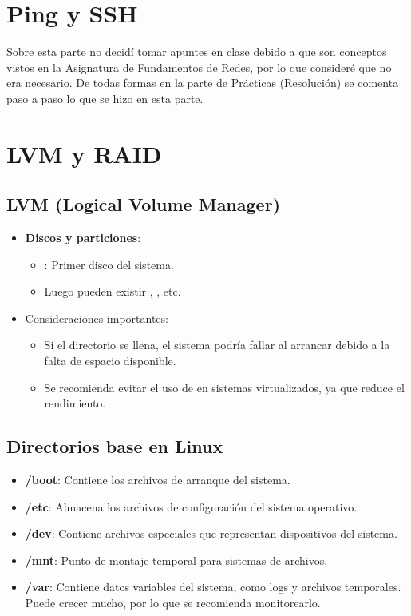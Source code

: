 \section{Ping y SSH}

Sobre esta parte no decidí tomar apuntes en clase debido a que son conceptos vistos en la Asignatura de Fundamentos de Redes, por lo que consideré que no era necesario. De todas formas en la parte de Prácticas (Resolución) se comenta paso a paso lo que se hizo en esta parte.
\newpage
\section{LVM y RAID}

\subsection{LVM (Logical Volume Manager)}

\begin{itemize}
    \item \textbf{Discos y particiones}:
    \begin{itemize}
        \item {}: Primer disco del sistema.
        \item Luego pueden existir , , etc.
    \end{itemize}
    \item Consideraciones importantes:
    \begin{itemize}
        \item Si el directorio  se llena, el sistema podría fallar al arrancar debido a la falta de espacio disponible.
        \item Se recomienda evitar el uso de  en sistemas virtualizados, ya que reduce el rendimiento.
    \end{itemize}
\end{itemize}

\subsection{Directorios base en Linux}
\begin{itemize}
    \item \textbf{/boot}: Contiene los archivos de arranque del sistema.
    \item \textbf{/etc}: Almacena los archivos de configuración del sistema operativo.
    \item \textbf{/dev}: Contiene archivos especiales que representan dispositivos del sistema.
    \item \textbf{/mnt}: Punto de montaje temporal para sistemas de archivos.
    \item \textbf{/var}: Contiene datos variables del sistema, como logs y archivos temporales. Puede crecer mucho, por lo que se recomienda monitorearlo.
\end{itemize}

